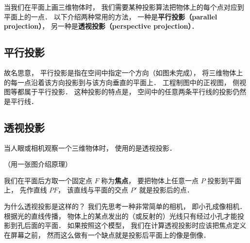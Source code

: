 

当我们在平面上画三维物体时， 我们需要某种投影算法把物体上的每个点对应到平面上的一点． 以下介绍两种常用的方法， 一种是\textbf{平行投影（parallel projection）}， 另一种是\textbf{透视投影（perspective projection）}．


\subsection{平行投影}
故名思意， 平行投影是指在空间中指定一个方向（如图未完成）， 将三维物体上的每一点沿着该方向投影到与该方向垂直的平面上． 工程制图中的正视图， 侧视图等都属于平行投影． 这种投影的特点是， 空间中的任意两条平行线的投影仍然是平行线．

\subsection{透视投影}
当人眼或相机观察一个三维物体时， 使用的是透视投影．

（用一张图介绍原理）

我们在平面后方取一个固定点 $F$ 称为\textbf{焦点}， 要把物体上任意一点 $P$ 投影到平面上， 先作直线 $PF$， 该直线与平面的交点 $P'$ 就是投影后的点．

为什么透视投影是这样的？ 我们先思考一种非常简单的相机， 即小孔成像相机． 根据光的直线传播， 物体上的某点发出的（或反射的）光线只有经过小孔才能投影到孔后面的平面． 如果按照这个模型， 我们在计算透视投影时应该把焦点定义在屏幕之前， 然而这么做有一个缺点就是投影后平面上的像是倒像．
